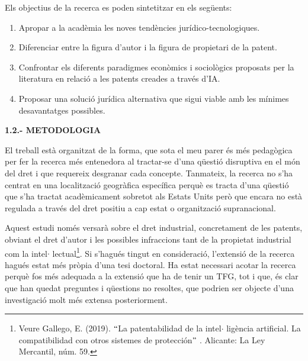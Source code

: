 \documentclass[12pt]{article}
\begin{document}
\vspace{\baselineskip}
\begin{justify}
Els objectius de la recerca es poden sintetitzar en els següents:
\end{justify}\par


\vspace{\baselineskip}
\begin{enumerate}
	\item Apropar a la acadèmia les noves tendències jurídico-tecnologiques.\par

	\item Diferenciar entre la figura d’autor i la figura de propietari de la patent.\par

	\item Confrontar els diferents paradigmes econòmics i sociològics  proposats per la literatura en relació a les patents creades a través d’IA.\par

	\item Proposar una solució jurídica alternativa que sigui viable amb les mínimes desavantatges possibles.
\end{enumerate}\par


\vspace{\baselineskip}
\textbf{1.2.- METODOLOGIA}\par


\vspace{\baselineskip}
\begin{justify}
El treball està organitzat de la forma, que sota el meu parer és més pedagògica per fer la recerca més entenedora al tractar-se d’una qüestió disruptiva en el món del dret i que requereix desgranar cada concepte. Tanmateix, la recerca no s’ha centrat en una localització geogràfica específica perquè es tracta d’una qüestió que s’ha tractat acadèmicament sobretot als Estats Units però que encara no està regulada a través del dret positiu a cap estat o organització supranacional. 
\end{justify}\par


\vspace{\baselineskip}
\begin{justify}
Aquest estudi només versarà sobre el dret industrial, concretament de les patents, obviant el dret d’autor i les possibles infraccions tant de la propietat industrial com la intel$ \cdot $ lectual\footnote{ Veure Gallego, E. (2019). $``$La patentabilidad de la intel$ \cdot $ ligència artificial. La compatibilidad con otros sistemes de protección$"$ . Alicante: La Ley Mercantil, núm. 59. }. Si s’hagués tingut en consideració, l’extensió de la recerca hagués estat més pròpia d’una tesi doctoral. Ha estat necessari acotar la recerca perquè fos més adequada a la extensió que ha de tenir un TFG, tot i que, és clar que han quedat preguntes i qüestions no resoltes, que podrien ser objecte d’una investigació molt més extensa posteriorment.
\end{justify}\par
\end{document}
